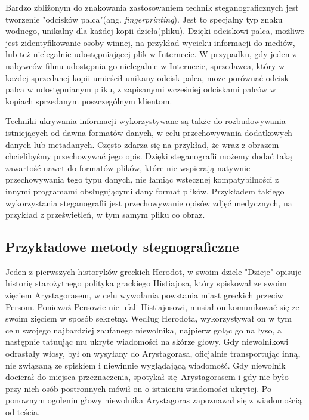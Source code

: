 \documentclass[a4paper, twoside, 12pt]{report}
\begin{document}
        Bardzo zbliżonym do znakowania zastosowaniem technik steganograficznych jest
        tworzenie "odcisków palca"(ang. \emph{fingerprinting}). Jest to specjalny
        typ znaku wodnego, unikalny dla każdej kopii dzieła(pliku). Dzięki odciskowi
        palca, możliwe jest zidentyfikowanie osoby winnej, na przykład wycieku informacji
        do mediów, lub też nielegalnie udostępniającej plik w Internecie. W przypadku,
        gdy jeden z nabywców filmu udostępnia go nielegalnie w Internecie, sprzedawca,
        który w każdej sprzedanej kopii umieścił unikany odcisk palca, może porównać
        odcisk palca w udostępnianym pliku, z zapisanymi wcześniej odciskami palców
        w kopiach sprzedanym poszczególnym klientom.

        Techniki ukrywania informacji wykorzystywane są także do rozbudowywania
        istniejących od dawna formatów danych, w celu przechowywania dodatkowych
        danych lub metadanych. Często zdarza się na przykład, że wraz z obrazem
        chcielibyśmy przechowywać jego opis. Dzięki steganografii możemy dodać
        taką zawartość nawet do formatów plików, które nie wspierają natywnie
        przechowywania tego typu danych, nie łamiąc wstecznej kompatybilności z innymi
        programami obsługującymi dany format plików. Przykładem takiego wykorzystania
        steganografii jest przechowywanie opisów zdjęć medycznych, na przykład
        z prześwietleń, w tym samym pliku co obraz.\cite{DISAPPEARINGCRYPTOEMBEDDINGMETDATA}

        \subsection{Przykładowe metody stegnograficzne}
        Jeden z pierwszych historyków greckich Herodot, w swoim dziele "Dzieje"
        opisuje historię starożytnego polityka grackiego Histiajosa, który spiskował
        ze swoim zięciem Arystagorasem, w celu wywołania powstania miast greckich
        przeciw Persom\cite{STEGANOGRAPHYINTRO}. Ponieważ Persowie nie ufali Histiajosowi, musiał on komunikować
        się ze swoim zięciem w sposób sekretny. Według Herodota, wykorzystywał
        on w tym celu swojego najbardziej zaufanego niewolnika, najpierw goląc
        go na łyso, a następnie tatuując mu ukryte wiadomości na skórze głowy.
        Gdy niewolnikowi odrastały włosy, był on wysyłany do Arystagorasa, oficjalnie
        transportując inną, nie związaną ze spiskiem i niewinnie wyglądającą wiadomość.
        Gdy niewolnik docierał do miejsca przeznaczenia, spotykał się Arystagorasem i
        gdy nie było przy nich osób postronnych mówił on o istnieniu wiadomości ukrytej.
        Po ponownym ogoleniu głowy niewolnika Arystagoras zapoznawał się z wiadomością
        od teścia.
\end{document}

